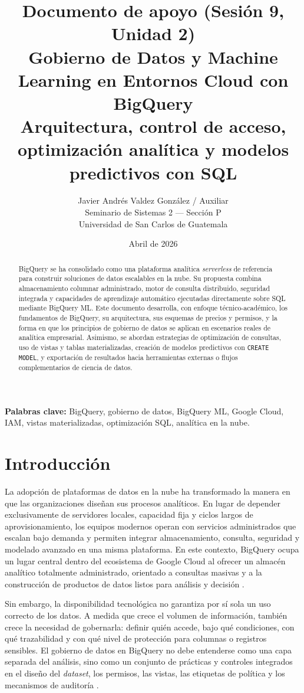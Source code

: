 \documentclass[12pt]{article}
\title{\textbf{Documento de apoyo (Sesión 9, Unidad 2)}\\
\large Gobierno de Datos y Machine Learning en Entornos Cloud con BigQuery\\
\normalsize Arquitectura, control de acceso, optimización analítica y modelos predictivos con SQL}
\author{Javier Andrés Valdez González / Auxiliar \\
\small Seminario de Sistemas 2 --- Sección P \\
\small Universidad de San Carlos de Guatemala}
\date{Abril de 2026}
\begin{document}
\maketitle

\begin{abstract}
BigQuery se ha consolidado como una plataforma analítica \textit{serverless} de referencia para construir soluciones de datos escalables en la nube. Su propuesta combina almacenamiento columnar administrado, motor de consulta distribuido, seguridad integrada y capacidades de aprendizaje automático ejecutadas directamente sobre SQL mediante BigQuery ML. Este documento desarrolla, con enfoque técnico-académico, los fundamentos de BigQuery, su arquitectura, sus esquemas de precios y permisos, y la forma en que los principios de gobierno de datos se aplican en escenarios reales de analítica empresarial. Asimismo, se abordan estrategias de optimización de consultas, uso de vistas y tablas materializadas, creación de modelos predictivos con \texttt{CREATE MODEL}, y exportación de resultados hacia herramientas externas o flujos complementarios de ciencia de datos.
\end{abstract}

\textbf{Palabras clave:} BigQuery, gobierno de datos, BigQuery ML, Google Cloud, IAM, vistas materializadas, optimización SQL, analítica en la nube.

\newpage
\tableofcontents

\section{Introducción}
La adopción de plataformas de datos en la nube ha transformado la manera en que las organizaciones diseñan sus procesos analíticos. En lugar de depender exclusivamente de servidores locales, capacidad fija y ciclos largos de aprovisionamiento, los equipos modernos operan con servicios administrados que escalan bajo demanda y permiten integrar almacenamiento, consulta, seguridad y modelado avanzado en una misma plataforma. En este contexto, BigQuery ocupa un lugar central dentro del ecosistema de Google Cloud al ofrecer un almacén analítico totalmente administrado, orientado a consultas masivas y a la construcción de productos de datos listos para análisis y decisión \cite{gcp_bigquery_overview,gcp_storage_overview}.

Sin embargo, la disponibilidad tecnológica no garantiza por sí sola un uso correcto de los datos. A medida que crece el volumen de información, también crece la necesidad de gobernarla: definir quién accede, bajo qué condiciones, con qué trazabilidad y con qué nivel de protección para columnas o registros sensibles. El gobierno de datos en BigQuery no debe entenderse como una capa separada del análisis, sino como un conjunto de prácticas y controles integrados en el diseño del \textit{dataset}, los permisos, las vistas, las etiquetas de política y los mecanismos de auditoría \cite{gcp_bigquery_governance,gcp_bigquery_iam}.
\end{document}
